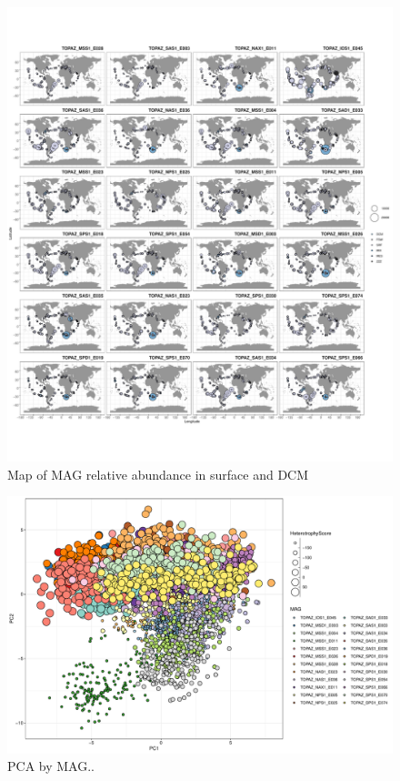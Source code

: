 \documentclass[12pt]{article}
\numberwithin{equation}{section}
\begin{document}
\begin{figure}
    \centering
    \includegraphics[width=0.9\columnwidth]{si-figures/SI-stramenopile-MAG-map.pdf}
    \caption{Map of MAG relative abundance in surface and DCM}
    \label{fig:dictyocho-SAR-map}
\end{figure}

\begin{figure}
    \centering
    \includegraphics[width=0.8\columnwidth]{si-figures/SI-SAR-Dictyocho-PCA-byMAG.pdf}
    \caption{PCA by MAG..}
    \label{fig:dictyocho-SAR-PCA-mag}
\end{figure}
\end{document}
